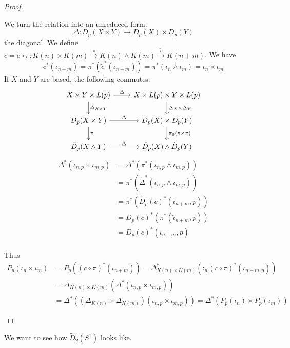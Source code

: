 \documentclass[language=english]{TemplateLecture}
\begin{document}
\begin{proof}
\begin{enumerate}
        We turn the relation into an unreduced form.
        \[\Delta\colon D_p(X\times Y) \to D_p(X)\times D_p(Y)\]
        the diagonal. We define \(c = \tilde c \circ \pi\colon K(n)\times K(m)\xrightarrow{\pi} K(n)\wedge K(m)\xrightarrow{\tilde c} K(n+m)\). We have
        \[c^*(\iota_{n+m}) = \pi^*(\tilde c^*(\iota_{n+m})) = \pi^*(\iota_n \wedge \iota_m) = \iota_n \times \iota_m\]
        If \(X\) and \(Y\) are based, the following commutes:
        \[\begin{tikzcd}
            X\times Y\times L(p) \ar[d, "\Delta_{X\times Y}"]\ar[r, "\Delta"] & X\times L(p)\times Y\times L(p) \ar[d, "\Delta_X \times \Delta_Y"] \\
            D_p(X\times Y) \ar[r, "\Delta"] \ar[d, "\pi"] & D_p(X)\times D_p(Y) \ar[d, "\pi_0(\pi\times \pi)"] \\
            \tilde D_p(X\wedge Y) \ar[r, "\tilde\Delta"] & \tilde D_p(X)\wedge \tilde D_p(Y)
        \end{tikzcd}\]
        \[\begin{split}
            \Delta^*(\iota_{n,p}\times \iota_{m,p}) &= \Delta^*(\pi^*(\iota_{n,p}\wedge \iota_{m,p})) \\
            &= \pi^*(\tilde \Delta^*(\iota_{n,p}\wedge \iota_{m,p})) \\
            &= \pi^*(\tilde D_p(c)^*(\tilde \iota_{n+m}, p)) \\
            &= D_p(c)^*(\pi^*(\tilde\iota_{n+m}, p)) \\
            &= D_p(c)^*(\iota_{n+m}, p) \\
        \end{split}\]

        Thus
        \[\begin{split}
            P_p(\iota_n\times \iota_m) &= P_p((c\circ \pi)^*(\iota_{n+m})) = \Delta^*_{K(n)\times K(m)}(:_p(c\circ \pi)^*(\iota_{n+m,p}))\\
            &= \Delta_{K(n)\times K(m)}(\Delta^*(\iota_{n,p}\times \iota_{m,p})) \\
            &= \Delta^*((\Delta_{K(n)}\times \Delta_{K(m)})(\iota_{n,p}\times \iota_{m,p}))= \Delta^*(P_p(\iota_n)\times P_p(\iota_m))
        \end{split}\]
    \end{enumerate}
\end{proof}


We want to see how \(\tilde D_2(S^1)\) looks like.
\end{document}
